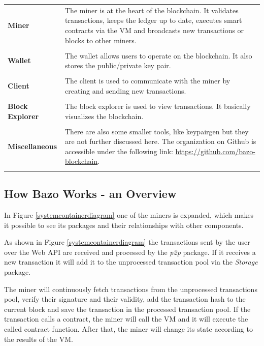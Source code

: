 \begin{tabular}[t]{ p{3cm} p{12.5cm}}
\textbf{Miner} &
The miner is at the heart of the blockchain. It validates transactions, keeps the ledger up to date, executes smart contracts via the VM and broadcasts new transactions or blocks to other miners. \\ \\
 
\raggedright
\textbf{Wallet} &
The wallet allows users to operate on the blockchain. It also stores the public/private key pair. \cite{ba_wallet} \\ \\
 
\textbf{Client} &
The client is used to communicate with the miner by creating and sending new transactions. \\ \\

\raggedright
\textbf{Block Explorer} & 
The block explorer is used to view transactions. It basically visualizes the blockchain. \\ \\

\raggedright
\textbf{Miscellaneous} & 
There are also some smaller tools, like keypairgen but they are not further discussed here. The organization on Github is accessible under the following link: \href{https://github.com/bazo-blockchain}{https://github.com/bazo-blockchain}. \\ \\
\end{tabular}

\subsection{How Bazo Works - an Overview}
In Figure \ref{systemcontainerdiagram} one of the miners is expanded, which makes it possible to see its packages and their relationships with other components. 

As shown in Figure \ref{systemcontainerdiagram} the transactions sent by the user over the Web API are received and processed by the \textit{\Gls{p2p}} package. If it receives a new transaction it will add it to the unprocessed transaction pool via the \textit{Storage} package. 

The miner will continuously fetch transactions from the unprocessed transactions pool, verify their signature and their validity, add the transaction hash to the current block and save the transaction in the processed transaction pool. If the transaction calls a contract, the miner will call the VM and it will execute the called contract function. After that, the miner will change its state according to the results of the VM.

